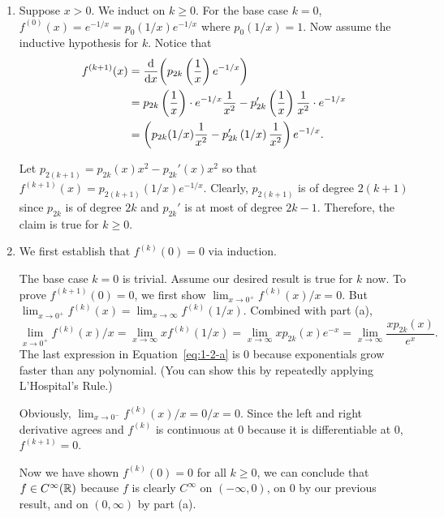 \begin{enumerate}[label=(\alph*)]

    \item Suppose $x > 0$. We induct on $k \geq 0$. For the base case $k = 0$, $f^{(0)}(x) = e^{-1/x} = p_{0}(1/x) e^{-1/x}$ where 
    $p_0 (1/x) = 1$. Now assume the inductive hypothesis for $k$. Notice that 
    \begin{align}
        f^{(k+1)}(x) &= \dv{x}( p_{2k}\left(\frac{1}{x}\right) e^{-1/x} ) \\ 
        &=  p_{2k}\left( \frac{1}{x} \right) \cdot e^{-1/x} \frac{1}{x^2} - p_{2k}'\left(\frac{1}{x}\right) \frac{1}{x^2} \cdot e^{-1/x} \\
        &= \left( p_{2k}(1/x) \frac{1}{x^2} - p_{2k}'\left(1/x\right) \frac{1}{x^2} \right) e^{-1/x} .
    \end{align}

    Let $p_{2(k+1)} = p_{2k} (x) x^2 - p_{2k}'(x) x^2$ so that $f^{(k+1)}(x) = p_{2(k+1)}(1/x) e^{-1/x}$. 
    Clearly, $p_{2(k+1)}$ is of degree $2(k+1)$ since $p_{2k}$ is of 
    degree $2k$ and $p_{2k}'$ is at most of degree $2k - 1$.
    Therefore, the claim is true for $k \geq 0$.

    \item We first establish that $f^{(k)}(0) = 0$ via induction.
    
    The base case $k=0$ is trivial. Assume our desired result is true for $k$ now.
    To prove $f^{(k+1)}(0) = 0$, we first show $\lim_{x \to 0^+} f^{(k)}(x) / x = 0$. But 
    $\lim_{x \to 0^+} f^{(k)} (x) = \lim_{x \to \infty} f^{(k)} (1/x)$. Combined with part (a), 
    \begin{equation} \label{eq:1-2-a}
        \lim_{x \to 0^+} f^{(k)} (x) / x = \lim_{x \to \infty} x f^{(k)} (1/x) = \lim_{x \to \infty} xp_{2k}(x) e^{-x} = \lim_{x \to \infty} \frac{xp_{2k}(x)}{e^x}.
    \end{equation}
    The last expression in Equation~\ref{eq:1-2-a} is $0$ because exponentials grow faster than any polynomial. (You can show 
    this by repeatedly applying L'Hospital's Rule.) 

    Obviously, $\lim_{x \to 0^-} f^{(k)}(x) / x = 0 / x = 0$. Since the left and right derivative agrees and $f^{(k)}$ 
    is continuous at $0$ because it is differentiable at $0$, $f^{(k+1)} = 0$.

    Now we have shown $f^{(k)}(0) = 0$ for all $k \geq 0$, we can conclude that $f \in C^\infty(\mathbb{R})$ 
    because $f$ is clearly $C^\infty$ on $(-\infty, 0)$, on $0$ by our previous result, and on $(0, \infty)$ by part (a).

\end{enumerate}


